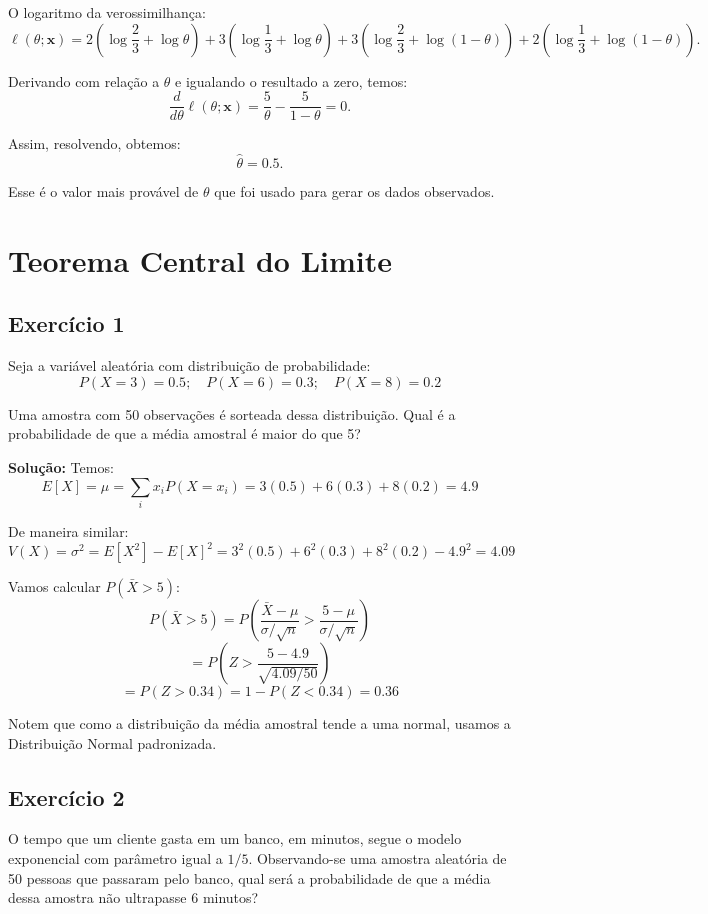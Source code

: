 \documentclass{article}
\begin{document}
O logaritmo da verossimilhança:
    $$
    \ell(\theta; \mathbf{x}) = 
    2\left(\log\frac{2}{3} + \log\theta\right) +
    3\left(\log\frac{1}{3} + \log\theta\right) +
    3\left(\log\frac{2}{3} + \log(1-\theta)\right) +
    2\left(\log\frac{1}{3} + \log(1-\theta)\right).
    $$

Derivando com relação a $\theta$ e igualando o resultado a zero, temos:
    $$
    \frac{d}{d\theta}\ell(\theta; \mathbf{x}) = 
    \frac{5}{\theta} - \frac{5}{1-\theta} = 0.
    $$
    
Assim, resolvendo, obtemos:
    $$
    \hat{\theta} = 0.5.
    $$

Esse é o valor mais provável de $\theta$ que foi usado para gerar os dados observados.

\section{Teorema Central do Limite}
\subsection{Exercício 1}
Seja a variável aleatória com distribuição de probabilidade:
    $$
    P(X = 3) = 0.5; \quad P(X = 6) = 0.3; \quad P(X = 8) = 0.2
    $$
    
Uma amostra com 50 observações é sorteada dessa distribuição.
Qual é a probabilidade de que a média amostral é maior do que 5?

\vspace{0.5cm}
\textbf{Solução:} 
Temos:
    $$
    E[X] = \mu = \sum_i x_i P(X = x_i) = 3(0.5) + 6(0.3) + 8(0.2) = 4.9
    $$

De maneira similar:
    $$
    V(X) = \sigma^2 = E[X^2] - E[X]^2 = 3^2(0.5) + 6^2(0.3) + 8^2(0.2) - 4.9^2 = 4.09
    $$

Vamos calcular $P(\bar{X} > 5)$:
    $$
    P(\bar{X} > 5) = P\left(\frac{\bar{X} - \mu}{\sigma / \sqrt{n}} > \frac{5 - \mu}{\sigma / \sqrt{n}}\right)
    $$
    $$
    = P\left(Z > \frac{5 - 4.9}{\sqrt{4.09 / 50}}\right)
    $$
    $$
    = P(Z > 0.34) = 1 - P(Z < 0.34) = 0.36
    $$

Notem que como a distribuição da média amostral tende a uma normal, usamos a Distribuição Normal padronizada.

\subsection{Exercício 2}
O tempo que um cliente gasta em um banco, em minutos, segue o modelo exponencial com parâmetro igual a $1/5$. Observando-se uma amostra aleatória de 50 pessoas que passaram pelo banco, qual será a probabilidade de que a média dessa amostra não ultrapasse 6 minutos?
\end{document}
